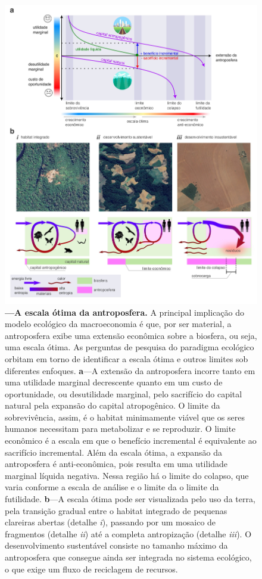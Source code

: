 \documentclass[./main.tex]{subfiles}
\begin{document}
\begin{figure}[t!] 
\centering				
\includegraphics[width=0.98\linewidth]{figs/fig_optscale.jpg}		
\caption[A escala ótima da Antroposfera]
{\textbf{---\;A escala ótima da antroposfera.}
    A principal implicação do modelo ecológico da macroeconomia é que, por ser material, a antroposfera exibe uma extensão econômica sobre a biosfera, ou seja, uma escala ótima. As perguntas de pesquisa do paradigma ecológico orbitam em torno de identificar a escala ótima e outros limites sob diferentes enfoques.
    \;\textbf{a}\;---\;A extensão da antroposfera incorre tanto em uma utilidade marginal decrescente quanto em um custo de oportunidade, ou desutilidade marginal, pelo sacrifício do capital natural pela expansão do capital atropogênico. O limite da sobrevivência, assim, é o habitat minimamente viável que os seres humanos necessitam para metabolizar e se reproduzir. O limite econômico é a escala em que o benefício incremental é equivalente ao sacrifício incremental. Além da escala ótima, a expansão da antroposfera é anti-econômica, pois resulta em uma utilidade marginal líquida negativa. Nessa região há o limite do colapso, que varia conforme a escala de análise e o limite da o limite da futilidade.
    \;\textbf{b}\;---\;A escala ótima pode ser visualizada pelo uso da terra, pela transição gradual entre o habitat integrado de pequenas clareiras abertas (detalhe \textrm{\textit{i}}), passando por um mosaico de fragmentos (detalhe \textrm{\textit{ii}}) até a completa antropização (detalhe \textrm{\textit{iii}}). O desenvolvimento sustentável consiste no tamanho máximo da antroposfera que consegue ainda ser integrada no sistema ecológico, o que exige um fluxo de reciclagem de recursos.
}
\label{fig:eco:escaleopt} 		
\end{figure}
\end{document}

